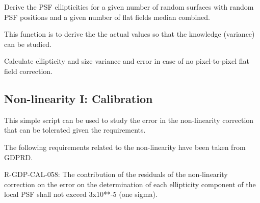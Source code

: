 \documentclass[a4paper,11pt,english]{sphinxmanual}
\begin{document}

\begin{fulllineitems}
\label{reduction:analysis.FlatfieldCalibration.testFlatCalibration}
Derive the PSF ellipticities for a given number of random surfaces with random PSF positions
and a given number of flat fields median combined.

This function is to derive the the actual values so that the knowledge (variance) can be studied.

\end{fulllineitems}


\begin{fulllineitems}
\label{reduction:analysis.FlatfieldCalibration.testNoFlatfieldingEffects}
Calculate ellipticity and size variance and error in case of no pixel-to-pixel flat field correction.

\end{fulllineitems}

\label{reduction:module-analysis.nonlinearityCalibration}

\subsection{Non-linearity I: Calibration}
\label{reduction:non-linearity-i-calibration}
This simple script can be used to study the error in the non-linearity correction that can be tolerated given the
requirements.

The following requirements related to the non-linearity have been taken from GDPRD.

R-GDP-CAL-058: The contribution of the residuals of the non-linearity correction on the error on the determination
of each ellipticity component of the local PSF shall not exceed 3x10**-5 (one sigma).
\end{document}
